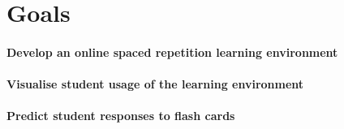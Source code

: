 \section{Goals}
\label{goals}
\paragraph{Develop an online spaced repetition learning environment}
\paragraph{Visualise student usage of the learning environment}
\paragraph{Predict student responses to flash cards}
